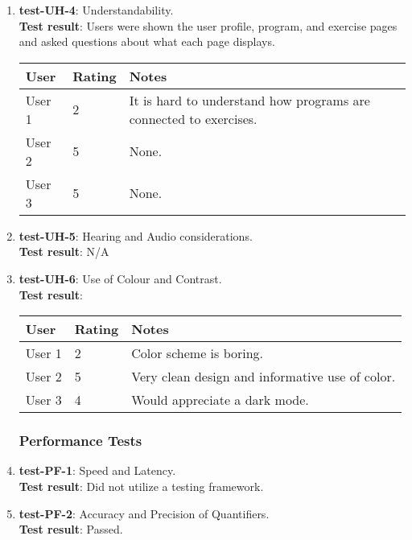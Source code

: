 \documentclass[12pt, titlepage]{article}
\begin{document}
\begin{enumerate}
	\item{\textbf{test-UH-4}}: Understandability.\\
	\textbf{Test result}:
	Users were shown the user profile, program, and exercise pages and asked questions about what each page displays.
	\begin{center}
		\begin{tabular}{ | m{3cm} | m{3cm}| m{6cm} | } 
		  \hline
		  User & Rating & Notes \\ 
		  \hline
		  User 1 & 2 & It is hard to understand how programs are connected to exercises. \\ 
		  \hline
		  User 2 & 5 & None. \\ 
		  \hline
		  User 3 & 5 & None. \\ 
		  \hline
		\end{tabular}
	\end{center}
	
	\item{\textbf{test-UH-5}}: Hearing and Audio considerations.\\
	\textbf{Test result}:
	N/A
	
	\item{\textbf{test-UH-6}}: Use of Colour and Contrast.\\
	\textbf{Test result}:
	\begin{center}
		\begin{tabular}{ | m{3cm} | m{3cm}| m{6cm} | } 
		  \hline
		  User & Rating & Notes \\ 
		  \hline
		  User 1 & 2 & Color scheme is boring. \\ 
		  \hline
		  User 2 & 5 & Very clean design and informative use of color. \\ 
		  \hline
		  User 3 & 4 & Would appreciate a dark mode.\\ 
		  \hline
		\end{tabular}
	\end{center}
	
\subsubsection{Performance Tests}
	\item{\textbf{test-PF-1}}: Speed and Latency.\\
	\textbf{Test result}: Did not utilize a testing framework.
	
	\item{\textbf{test-PF-2}}: Accuracy and Precision of Quantifiers.\\
	\textbf{Test result}: Passed.
	

\end{enumerate}
\end{document}

